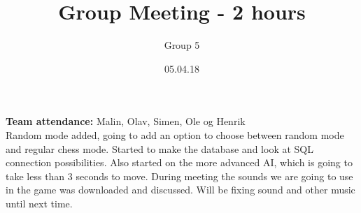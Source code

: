 \documentclass{article}
\title{Group Meeting - 2 hours}
\author{Group 5}
\date{05.04.18}
\begin{document}
	\maketitle
	\noindent
	\textbf{Team attendance:} Malin, Olav, Simen, Ole og Henrik \\

	\noindent
	Random mode added, going to add an option to choose between random mode and regular chess mode.
	Started to make the database and look at SQL connection possibilities. Also started on the
	more advanced AI, which is going to take less than 3 seconds to move. During meeting the
	sounds we are going to use in the game was downloaded and discussed. Will be fixing sound
	and other music until next time.
\end{document}

